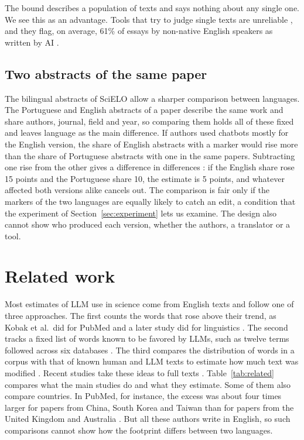 \documentclass[12pt]{article}
\begin{document}
The bound describes a population of texts and says nothing about any single one. We see this as an
advantage. Tools that try to judge single texts are unreliable \cite{weberwulff2023testing}, and
they flag, on average, 61\% of essays by non-native English speakers as written by AI
\cite{liang2023gpt}.

\subsection{Two abstracts of the same paper}
\label{sec:paired-theory}

The bilingual abstracts of SciELO allow a sharper comparison between languages. The Portuguese and
English abstracts of a paper describe the same work and share authors, journal, field and year, so
comparing them holds all of these fixed and leaves language as the main difference. If authors used
chatbots mostly for the English version, the share of English abstracts with a marker would rise
more than the share of Portuguese abstracts with one in the same papers. Subtracting one rise from
the other gives a difference in differences \cite{angrist2009mostly}: if the English share rose 15
points and the Portuguese share 10, the estimate is 5 points, and whatever affected both versions
alike cancels out. The comparison is fair only if the markers of the two languages are equally
likely to catch an edit, a condition that the experiment of Section~\ref{sec:experiment} lets us
examine. The design also cannot show who produced each version, whether the authors, a translator
or a tool.

\section{Related work}
\label{sec:related}

Most estimates of LLM use in science come from English texts and follow one of three approaches.
The first counts the words that rose above their trend, as Kobak et al.\ did for PubMed
\cite{kobak2025delving} and a later study did for linguistics \cite{botes2026initial}. The second
tracks a fixed list of words known to be favored by LLMs, such as twelve terms followed across six
databases \cite{kousha2026much}. The third compares the distribution of words in a corpus with that
of known human and LLM texts to estimate how much text was modified
\cite{liang2025quantifying,geng2024transforming}. Recent studies take these ideas to full texts
\cite{siler2026diffusion,holzwarth2026most}. Table~\ref{tab:related} compares what the main studies
do and what they estimate. Some of them also compare countries. In PubMed, for instance, the excess
was about four times larger for papers from China, South Korea and Taiwan than for papers from the
United Kingdom and Australia \cite{kobak2025delving}. But all these authors write in English, so
such comparisons cannot show how the footprint differs between two languages.
\end{document}
